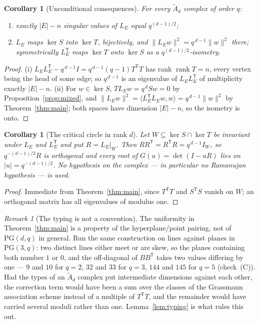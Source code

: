 \documentclass[11pt]{amsart}
\numberwithin{equation}{section}
\newtheorem{corollary}[theorem]{Corollary}
\theoremstyle{definition}
\theoremstyle{remark}
\newtheorem{remark}[theorem]{Remark}
\newcommand{\Atilde}[1]{\widetilde A_{#1}}
\newcommand{\LE}{L_{E}}
\newcommand{\rank}{\operatorname{rank}}
\newcommand{\PG}{\mathrm{PG}}
\begin{document}
\begin{corollary}[Unconditional consequences]\label{cor:uncond}
For every $\Atilde d$ complex of order $q$:
\begin{enumerate}
\item[(i)] exactly $|E|-n$ singular values of $\LE$ equal $q^{(d-1)/2}$;
\item[(ii)] $\LE$ maps $\ker S$ into $\ker T$, bijectively, and
$\|\LE w\|^2=q^{\,d-1}\|w\|^2$ there; symmetrically $\LE^{\mathsf T}$ maps $\ker T$ onto
$\ker S$ as a $q^{(d-1)/2}$-isometry.
\end{enumerate}
\end{corollary}

\begin{proof}
(i) $\LE\LE^{\mathsf T}-q^{\,d-1}I=q^{\,d-1}(q-1)T^{\mathsf T}T$ has rank
$\rank T=n$, every vertex being the head of some edge; so $q^{\,d-1}$ is an eigenvalue of
$\LE\LE^{\mathsf T}$ of multiplicity exactly $|E|-n$. (ii) For $w\in\ker S$,
$T\LE w=q^{\,d}Sw=0$ by Proposition~\ref{prop:mixed}, and
$\|\LE w\|^2=\langle\LE^{\mathsf T}\LE w,w\rangle=q^{\,d-1}\|w\|^2$ by
Theorem~\ref{thm:main}; both spaces have dimension $|E|-n$, so the isometry is onto.
\end{proof}

\begin{corollary}[The critical circle in rank $d$]\label{cor:circle}
Let $W\subseteq\ker S\cap\ker T$ be invariant under $\LE$ and $\LE^{\mathsf T}$ and put
$R=\LE|_W$. Then $RR^{\mathsf T}=R^{\mathsf T}R=q^{\,d-1}I_W$, so $q^{-(d-1)/2}R$ is
orthogonal and every root of $G(u)=\det(I-uR)$ lies on $|u|=q^{-(d-1)/2}$. No hypothesis
on the complex --- in particular no Ramanujan hypothesis --- is used.
\end{corollary}

\begin{proof}
Immediate from Theorem~\ref{thm:main}, since $T^{\mathsf T}T$ and $S^{\mathsf T}S$ vanish
on $W$; an orthogonal matrix has all eigenvalues of modulus one.
\end{proof}

\begin{remark}[The typing is not a convention]\label{rem:typing}
The uniformity in Theorem~\ref{thm:main} is a property of the hyperplane/point pairing, not
of $\PG(d,q)$ in general. Run the same construction on lines against planes in $\PG(3,q)$:
two distinct lines either meet or are skew, so the planes containing both number $1$ or
$0$, and the off-diagonal of $BB^{\mathsf T}$ takes two values differing by one --- $9$ and
$10$ for $q=2$, $32$ and $33$ for $q=3$, $144$ and $145$ for $q=5$ (check~(C)). Had the
types of an $\Atilde d$ complex put intermediate dimensions against each other, the
correction term would have been a sum over the classes of the Grassmann association scheme
instead of a multiple of $T^{\mathsf T}T$, and the remainder would have carried several
moduli rather than one. Lemma~\ref{lem:typing} is what rules this out.
\end{remark}
\end{document}
